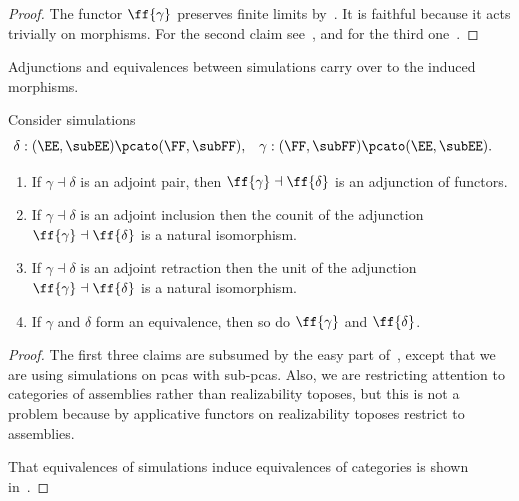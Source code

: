 \begin{proof}
  The functor $\ff{\gamma}$ preserves finite limits
  by~\cite[Proposition~2.2.2]{Longley:95}. It is faithful
  because it acts trivially on morphisms.
  For the second claim see~\cite[Theorem~2.4.12]{Longley:95}, and for the third one~\cite[Theorem~2.4.19]{Longley:95}.
\end{proof}

Adjunctions and equivalences between simulations carry over to the induced morphisms.

\begin{theorem}
  \label{th:applicative_adjunction_functor_adjunction}%
  Consider simulations
  \begin{align*}
    \delta &: (\EE, \subEE) \pcato (\FF, \subFF),
    &
    \gamma &: (\FF, \subFF) \pcato (\EE, \subEE).
  \end{align*}
  \begin{enumerate}
  \item If $\gamma \dashv \delta$ is an adjoint pair, then
    $\ff{\gamma} \dashv \ff{\delta}$ is an adjunction of functors.
  \item If $\gamma \dashv \delta$ is an adjoint inclusion then the counit of the adjunction $\ff{\gamma} \dashv \ff{\delta}$ is a natural isomorphism.
  \item If $\gamma \dashv \delta$ is an adjoint retraction then the unit of the adjunction $\ff{\gamma} \dashv \ff{\delta}$ is a natural isomorphism.
  \item If $\gamma$ and $\delta$ form an equivalence, then so do $\ff{\gamma}$ and
    $\ff{\delta}$.
  \end{enumerate}
\end{theorem}

\begin{proof}
  The first three claims are subsumed by the easy part of~\cite[Proposition 2.5.9]{Longley:95}, except that we are using simulations on pcas with sub-pcas. Also, we are restricting attention to categories of assemblies rather than realizability toposes, but this is not a problem because by applicative functors on realizability toposes restrict to assemblies.

  That equivalences of simulations induce equivalences of categories is shown in~\cite[Theorem 2.5.6]{Longley:95}.
\end{proof}

